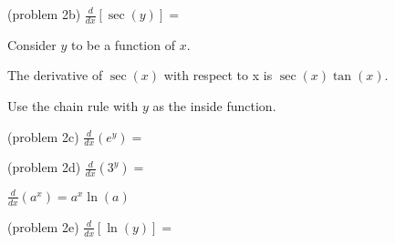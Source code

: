 \documentclass{ximera}
\begin{document}
\begin{problem}(problem 2b)
$\displaystyle{\frac{d}{dx} \left[\sec(y)\right]=}$
 
\begin{multipleChoice}
\end{multipleChoice}
    
    \begin{hint}
      Consider $y$ to be a function of $x$.
    \end{hint}
    \begin{hint}
     The derivative of $\sec(x)$ with respect to x is $\sec(x)\tan(x)$.
    \end{hint}
		\begin{hint}
      Use the chain rule with $y$ as the inside function.
    \end{hint}
    
\end{problem}


\begin{problem}(problem 2c)
$\displaystyle{\frac{d}{dx} \left(e^y\right)=}$
 
\begin{multipleChoice}
\end{multipleChoice}
	  
    
\end{problem}


\begin{problem}(problem 2d)
$\displaystyle{\frac{d}{dx} \left(3^y\right)=}$
 
\begin{multipleChoice}
\end{multipleChoice}
	  
    \begin{hint}
       $\frac{d}{dx}\left(a^x\right)=a^x\ln(a)$
    \end{hint}
  	
\end{problem}


\begin{problem}(problem 2e)
$\displaystyle{\frac{d}{dx} \left[\ln(y)\right]=}$
 
\begin{multipleChoice}
\end{multipleChoice}
    
\end{problem}
\end{document}
